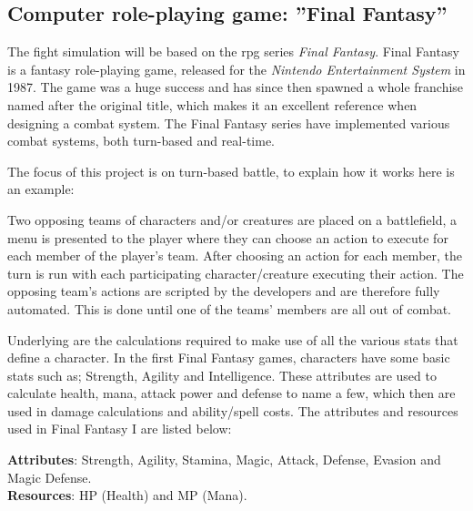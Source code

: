 

\subsection{Computer role-playing game: ''Final Fantasy''}
The fight simulation will be based on the \ac{rpg} series \emph{Final Fantasy}. Final Fantasy is a fantasy role-playing game, released for the \emph{Nintendo Entertainment System} in 1987. The game was a huge success and has since then spawned a whole franchise named after the original title, which makes it an excellent reference when designing a combat system.
The Final Fantasy series have implemented various combat systems, both turn-based and real-time.\cite{ffantasy}

The focus of this project is on turn-based battle, to explain how it works here is an example:

Two opposing teams of characters and/or creatures are placed on a battlefield, a menu is presented to the player where they can choose an action to execute for each member of the player's team. After choosing an action for each member, the turn is run with each participating character/creature executing their action. The opposing team's actions are scripted by the developers and are therefore fully automated.
This is done until one of the teams' members are all out of combat.

Underlying are the calculations required to make use of all the various stats that define a character. In the first Final Fantasy games, characters have some basic stats such as; Strength, Agility and Intelligence. These attributes are used to calculate health, mana, attack power and defense to name a few, which then are used in damage calculations and ability/spell costs. The attributes and resources used in Final Fantasy I are listed below:

\textbf{Attributes}: Strength, Agility, Stamina, Magic, Attack, Defense, Evasion and Magic Defense.\\
\textbf{Resources}: HP (Health) and MP (Mana).


